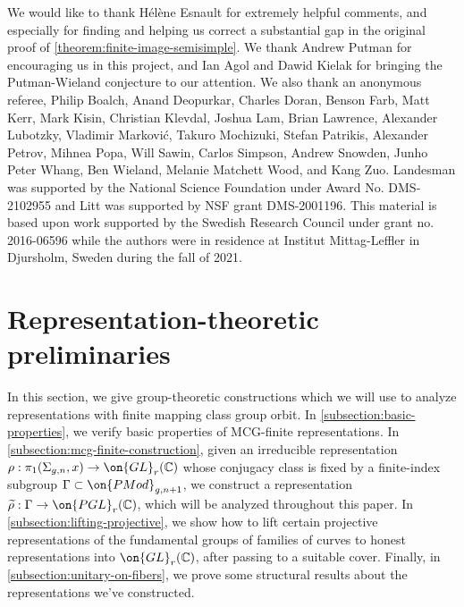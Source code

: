 \documentclass[12 pt]{amsart}
\theoremstyle{plain}
\theoremstyle{definition}
\theoremstyle{remark}
\numberwithin{equation}{section}
\begin{document}
We would like to thank H\'el\`ene Esnault
for extremely helpful comments, and especially for finding and helping us correct a substantial gap in the original proof of \autoref{theorem:finite-image-semisimple}. We thank Andrew Putman for encouraging us in this project, and Ian Agol and Dawid Kielak for bringing the Putman-Wieland conjecture to our attention.
We also thank an anonymous referee,
Philip Boalch,
Anand Deopurkar,
Charles Doran,
Benson Farb,
Matt Kerr,
Mark Kisin,
Christian Klevdal,
Joshua Lam,
Brian Lawrence,
Alexander Lubotzky,
Vladimir Markovi\'c,
Takuro Mochizuki,
Stefan Patrikis,
Alexander Petrov,
Mihnea Popa,
Will Sawin,
Carlos Simpson,
Andrew Snowden,
Junho Peter Whang,
Ben Wieland,
Melanie Matchett Wood, 
and Kang Zuo.
Landesman was supported by the National Science Foundation under Award No. DMS-2102955 
and Litt was supported by NSF grant DMS-2001196.
This material is based upon work supported by the Swedish Research Council under grant no. 2016-06596 while the authors were in residence at Institut Mittag-Leffler in Djursholm, Sweden during the fall of 2021.

\section{Representation-theoretic preliminaries}
\label{section:representation-preliminaries}

In this section, we give group-theoretic constructions which we will use to
analyze representations with finite mapping class group orbit.
In \autoref{subsection:basic-properties},
we verify basic properties of MCG-finite representations. 
In \autoref{subsection:mcg-finite-construction}, given an irreducible representation
$\rho: \pi_1(\Sigma_{g,n},x) \to \on{GL}_r(\mathbb C)$ whose conjugacy class is fixed by a finite-index subgroup $\Gamma\subset\on{PMod}_{g,n+1}$, we construct a representation
$\widetilde{\rho}:  \Gamma \to \on{PGL}_r(\mathbb C)$,
which will be analyzed throughout this paper.
In \autoref{subsection:lifting-projective},
we show how to lift certain projective representations of the fundamental groups of families of curves to honest representations into
$\on{GL}_r(\mathbb C)$,
after passing to a suitable cover. Finally, in
\autoref{subsection:unitary-on-fibers}, we prove some structural results about the representations we've constructed.
\end{document}
